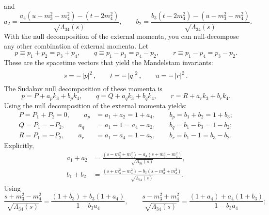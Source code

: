 and
\begin{equation}
	a_{2} = \frac{a_{4} \left( u - m_{3}^{2} - m_{4}^{2} \right) - \left( t - 2 m_{4}^{2} \right) }{\sqrt{\Lambda_{34}(s)}}, \qquad
	b_{2} = \frac{b_{3} \left( t - 2 m_{4}^{2} \right) - \left( u - m_{3}^{2} - m_{4}^{2} \right) }{\sqrt{\Lambda_{34}(s)}}.
\end{equation}
With the null decomposition of the external momenta, you can null-decompose any other combination of external momenta. Let
\begin{equation}
	p \equiv p_{1} + p_{2} = p_{3} + p_{4}, \qquad q \equiv p_{1} - p_{3} = p_{4} - p_{2}, \qquad r \equiv p_{1} - p_{4} = p_{3} - p_{2}.
\end{equation}
These are the spacetime vectors that yield the Mandelstam invariants:
\begin{equation}
	s = -\left\lvert p \right\rvert^{2}, \qquad t = -\left\lvert q \right\rvert^{2}, \qquad u = -\left\lvert r \right\rvert^{2}.
\end{equation}
The Sudakov null decomposition of these momenta is
\begin{equation}
	p = P + a_{p} k_{3} + b_{p} k_{4}, \qquad q = Q + a_{q} k_{3} + b_{q} k_{4}, \qquad r = R + a_{r} k_{3} + b_{r} k_{4}.
\end{equation}
Using the null decomposition of the external momenta yields:
\begin{align}
	P = P_{1} + P_{2} = 0, \qquad a_{p} &= a_{1} + a_{2} = 1 + a_{4}, \qquad b_{p} = b_{1} + b_{2} = 1 + b_{3}; \\
	Q = P_{1} = -P_{2}, \qquad a_{q} &= a_{1} - 1 = a_{4} - a_{2}, \qquad b_{q} = b_{1} - b_{3} = 1 - b_{2}; \\
	R = P_{1} = -P_{2}, \qquad a_{r} &= a_{1} - a_{4} = 1 - a_{2}, \qquad b_{r} = b_{1} - 1 = b_{3} - b_{2}.
\end{align}
Explicitly,
\begin{align}
	a_{1} + a_{2} &= \frac{ \left(s - m_{3}^{2} + m_{4}^{2}\right) - a_{4} \left(s + m_{3}^{2} - m_{4}^{2} \right) }{\sqrt{\Lambda_{34}(s)}}, \\
	b_{1} + b_{2} &= \frac{ \left(s + m_{3}^{2} - m_{4}^{2}\right) - b_{3} \left(s - m_{3}^{2} + m_{4}^{2} \right) }{\sqrt{\Lambda_{34}(s)}}.
\end{align}
Using
\begin{equation}
	\frac{s + m_{3}^{2} - m_{4}^{2}}{\sqrt{\Lambda_{34}(s)}} = \frac{\left( 1 + b_{3} \right) + b_{3} \left( 1 + a_{4} \right)}{1 - b_{3} a_{4}}, \qquad \frac{s - m_{3}^{2} + m_{4}^{2}}{\sqrt{\Lambda_{34}(s)}} = \frac{\left( 1 + a_{4} \right) + a_{4} \left( 1 + b_{3} \right)}{1 - b_{3} a_{4}};
\end{equation}
